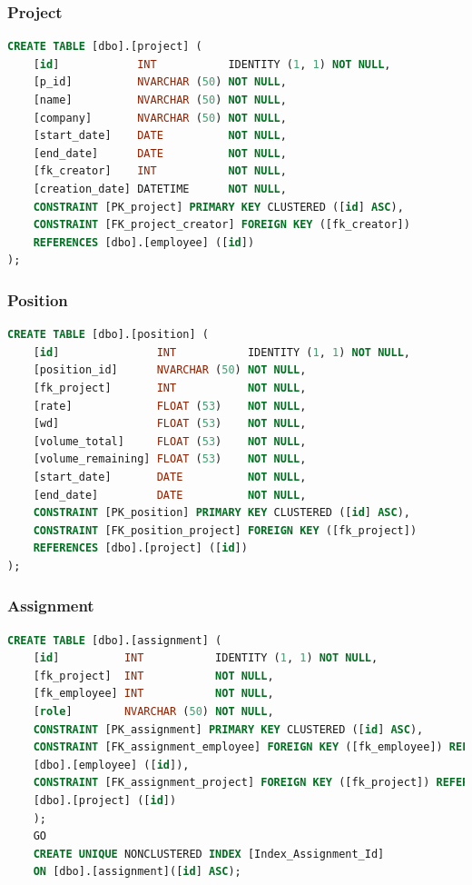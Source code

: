 \documentclass{article}
\begin{document}
        \subsubsection{Project}
        \begin{lstlisting}[language=Sql, caption= Create Table Statement für Project Table]
    CREATE TABLE [dbo].[project] (
    [id]            INT           IDENTITY (1, 1) NOT NULL,
    [p_id]          NVARCHAR (50) NOT NULL,
    [name]          NVARCHAR (50) NOT NULL,
    [company]       NVARCHAR (50) NOT NULL,
    [start_date]    DATE          NOT NULL,
    [end_date]      DATE          NOT NULL,
    [fk_creator]    INT           NOT NULL,
    [creation_date] DATETIME      NOT NULL,
    CONSTRAINT [PK_project] PRIMARY KEY CLUSTERED ([id] ASC),
    CONSTRAINT [FK_project_creator] FOREIGN KEY ([fk_creator]) 
    REFERENCES [dbo].[employee] ([id])
);
         \end{lstlisting}
        \subsubsection{Position}
        \begin{lstlisting}[language=Sql, caption= Create Table Statement für Position Table]
    CREATE TABLE [dbo].[position] (
    [id]               INT           IDENTITY (1, 1) NOT NULL,
    [position_id]      NVARCHAR (50) NOT NULL,
    [fk_project]       INT           NOT NULL,
    [rate]             FLOAT (53)    NOT NULL,
    [wd]               FLOAT (53)    NOT NULL,
    [volume_total]     FLOAT (53)    NOT NULL,
    [volume_remaining] FLOAT (53)    NOT NULL,
    [start_date]       DATE          NOT NULL,
    [end_date]         DATE          NOT NULL,
    CONSTRAINT [PK_position] PRIMARY KEY CLUSTERED ([id] ASC),
    CONSTRAINT [FK_position_project] FOREIGN KEY ([fk_project]) 
    REFERENCES [dbo].[project] ([id])
);
         \end{lstlisting}
        \subsubsection{Assignment}
        \begin{lstlisting}[language=Sql, caption= Create Table Statement für Assignment Table]
    CREATE TABLE [dbo].[assignment] (
    [id]          INT           IDENTITY (1, 1) NOT NULL,
    [fk_project]  INT           NOT NULL,
    [fk_employee] INT           NOT NULL,
    [role]        NVARCHAR (50) NOT NULL,
    CONSTRAINT [PK_assignment] PRIMARY KEY CLUSTERED ([id] ASC),
    CONSTRAINT [FK_assignment_employee] FOREIGN KEY ([fk_employee]) REFERENCES
    [dbo].[employee] ([id]),
    CONSTRAINT [FK_assignment_project] FOREIGN KEY ([fk_project]) REFERENCES
    [dbo].[project] ([id])
    );
    GO
    CREATE UNIQUE NONCLUSTERED INDEX [Index_Assignment_Id]
    ON [dbo].[assignment]([id] ASC);


         \end{lstlisting}
\end{document}
